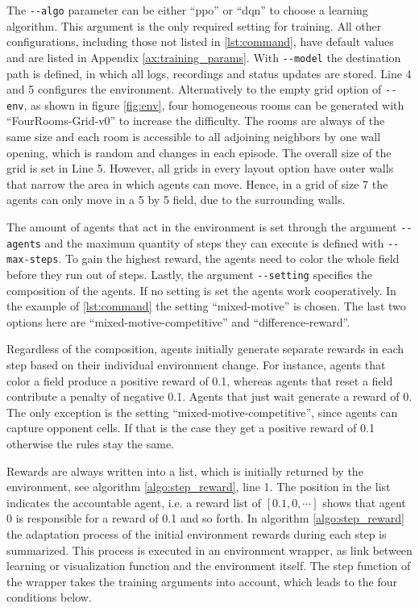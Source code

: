 The \verb|--algo| parameter can be either ``ppo'' or ``dqn'' to choose a learning algorithm. This argument is the only required setting for training. All other configurations, including those not listed in \ref{lst:command}, have default values and are listed in Appendix \ref{ax:training_params}.
With \verb|--model| the destination path is defined, in which all logs, recordings and status updates are stored. Line 4 and 5 configures the environment. Alternatively to the empty grid option of \verb|--env|, as shown in figure \ref{fig:env}, four homogeneous rooms can be generated with ``FourRooms-Grid-v0'' to increase the difficulty. The rooms are always of the same size and each room is accessible to all adjoining neighbors by one wall opening, which is random and changes in each episode. The overall size of the grid is set in Line 5. However, all grids in every layout option have outer walls that narrow the area in which agents can move. Hence, in a grid of size 7 the agents can only move in a 5 by 5 field, due to the surrounding walls.

The amount of agents that act in the environment is set through the argument \verb|--agents| and the maximum quantity of steps they can execute is defined with \verb|--max-steps|. To gain the highest reward, the agents need to color the whole field before they run out of steps. Lastly, the argument \verb|--setting| specifies the composition of the agents. If no setting is set the agents work cooperatively. In the example of \ref{lst:command} the setting ``mixed-motive'' is chosen. The last two options here are ``mixed-motive-competitive'' and ``difference-reward''. %

Regardless of the composition, agents initially generate separate rewards in each step based on their individual environment change. For instance, agents that color a field produce a positive reward of 0.1, whereas agents that reset a field contribute a penalty of negative 0.1. Agents that just wait generate a reward of 0. The only exception is the setting ``mixed-motive-competitive'', since agents can capture opponent cells. If that is the case they get a positive reward of 0.1 otherwise the rules stay the same. 

Rewards are always written into a list, which is initially returned by the environment, see algorithm \ref{algo:step_reward}, line 1. The position in the list indicates the accountable agent, i.e. a reward list of $[0.1, 0, \cdots ]$ shows that agent 0 is responsible for a reward of 0.1 and so forth. In algorithm \ref{algo:step_reward} the adaptation process of the initial environment rewards during each step is summarized. This process is executed in an environment wrapper, as link between learning or visualization function and the environment itself. The step function of the wrapper takes the training arguments into account, which leads to the four conditions below.

